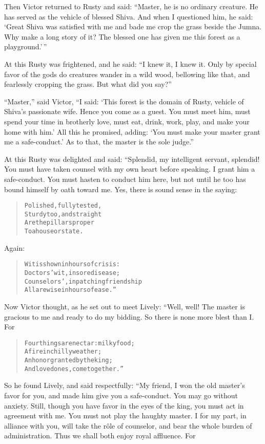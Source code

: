 \documentclass[article, twoside, 10pt]{memoir}
\renewenvironment{verbatim}{%
\begin{quote}%
\vskip -10pt%
\begin{alltt}\normalfont\small}{\end{alltt}%
\end{quote}%
\vskip -10pt
} %
\begin{document}
Then Victor returned to Rusty and said:
``Master, he is no ordinary creature. He has served as the vehicle of blessed Shiva. And when I questioned him, he said: `Great Shiva was satisfied with me and bade me crop the grass beside the Jumna. Why make a long story of it? The blessed one has given me this forest as a playground.'\,''

At this Rusty was frightened, and he said:
``I knew it, I knew it. Only by special favor of the gods do creatures wander in a wild wood, bellowing like that, and fearlessly cropping the grass. But what did you say?''

``Master,'' said Victor,
``I said: `This forest is the domain of Rusty, vehicle of Shiva's passionate wife. Hence you come as a guest. You must meet him, must spend your time in brotherly love, must eat, drink, work, play, and make your home with him.' All this he promised, adding: `You must make your master grant me a safe-conduct.' As to that, the master is the sole judge.''

At this Rusty was delighted and said: “Splendid, my intelligent
servant, splendid! You must have taken counsel with my own heart
before speaking. I grant him a safe-conduct. You must hasten to
conduct him here, but not until he too has bound himself by oath
toward me. Yes, there is sound sense in the saying:

\begin{verbatim}
Polished, fully tested,
    Sturdy too, and straight
Are the pillars proper
    To a house{\textemdash}or state.
\end{verbatim}
Again:

\begin{verbatim}
Wit is shown in hours of crisis:
    Doctors' wit, in sore disease;
Counselors', in patching friendship{\textemdash}
    All are wise in hours of ease.”
\end{verbatim}
Now Victor thought, as he set out to meet Lively: “Well, well! The
master is gracious to me and ready to do my bidding. So there is
none more blest than I. For

\begin{verbatim}
Four things are nectar: milky food;
    A fire in chilly weather;
An honor granted by the king;
    And loved ones, come together.”
\end{verbatim}
So he found Lively, and said respectfully: “My friend, I won the
old master's favor for you, and made him give you a safe-conduct.
You may go without anxiety. Still, though you have favor in the
eyes of the king, you must act in agreement with me. You must not
play the haughty master. I for my part, in alliance with you, will
take the rôle of counselor, and bear the whole burden of
administration. Thus we shall both enjoy royal affluence. For
\end{document}
